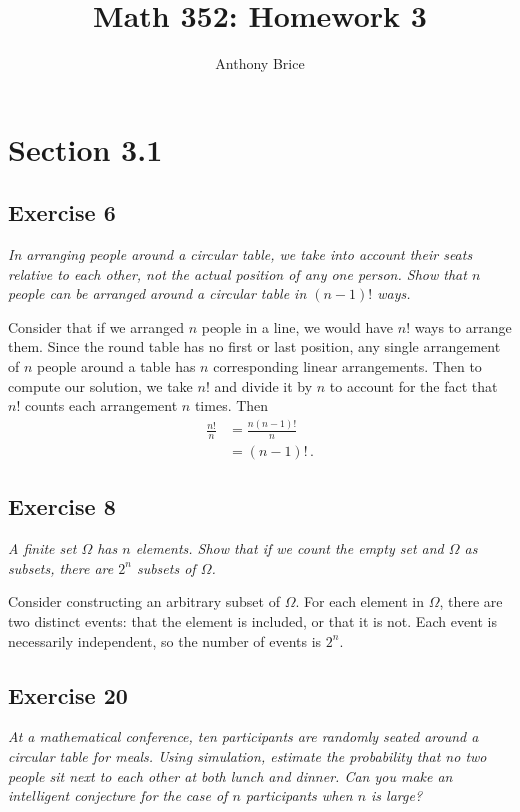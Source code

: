 \documentclass{tufte-handout}
\title{Math 352: Homework 3}
\author{Anthony Brice}
\begin{document}
\maketitle
\section{Section 3.1}
\subsection{Exercise 6}
\begin{description}
\item \emph{In arranging people around a circular table, we take into
    account their seats relative to each other, not the actual
    position of any one person. Show that $n$ people can be arranged
    around a circular table in $(n - 1)!$ ways.}
\end{description}

Consider that if we arranged $n$ people in a line, we would have $n!$
ways to arrange them. Since the round table has no first or last
position, any single arrangement of $n$ people around a table has $n$
corresponding linear arrangements. Then to compute our solution, we
take $n!$ and divide it by $n$ to account for the fact that $n!$
counts each arrangement $n$ times. Then
\begin{align*}
\frac{n!}{n} &= \frac{n(n-1)!}{n}\\
&= (n-1)! \, .
\end{align*}

\subsection{Exercise 8}
\begin{description}
\item \emph{A finite set $\Omega$ has $n$ elements. Show that if we
    count the empty set and $\Omega$ as subsets, there are $2^n$ subsets
    of $\Omega$.}
\end{description}

Consider constructing an arbitrary subset of $\Omega$. For each
element in $\Omega$, there are two distinct events: that the element
is included, or that it is not. Each event is necessarily independent,
so the number of events is $2^n$.

\subsection{Exercise 20}
\begin{description}
\item \emph{At a mathematical conference, ten participants are
    randomly seated around a circular table for meals. Using
    simulation, estimate the probability that no two people sit next
    to each other at both lunch and dinner. Can you make an
    intelligent conjecture for the case of $n$ participants when $n$
    is large?}
\end{description}
\end{document}
